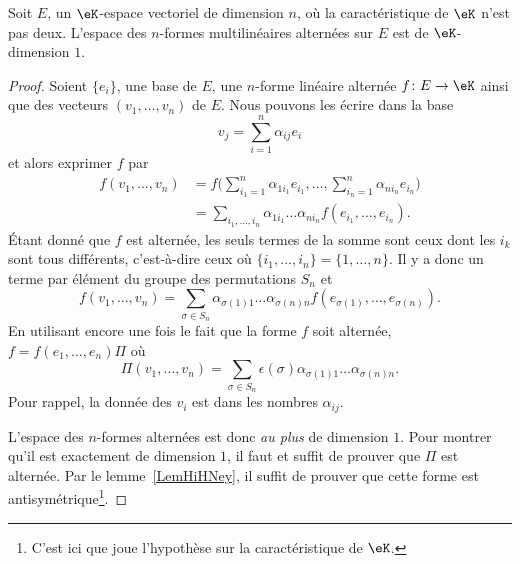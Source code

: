 \begin{proposition} \label{ProprbjihK}
	Soit \( E\), un \( \eK\)-espace vectoriel de dimension \( n\), où la caractéristique de \( \eK\) n'est pas deux. L'espace des \( n\)-formes multilinéaires alternées sur \( E\) est de \( \eK\)-dimension \( 1\).
\end{proposition}

\begin{proof}
	Soient \( \{ e_i \}\), une base de \( E\), une \( n\)-forme linéaire alternée \( f\colon E\to \eK\) ainsi que des vecteurs \( (v_1,\ldots, v_n)\) de \( E\). Nous pouvons les écrire dans la base
	\begin{equation}
		v_j=\sum_{i=1}^n\alpha_{ij}e_i
	\end{equation}
	et alors exprimer \( f\) par
	\begin{subequations}
		\begin{align}
			f(v_1,\ldots, v_n) & =f\big( \sum_{i_1=1}^n\alpha_{1i_1}e_{i_1},\ldots, \sum_{i_n=1}^n\alpha_{ni_n}e_{i_n} \big) \\
			                   & =\sum_{i_1,\ldots, i_n}\alpha_{1i_1}\ldots \alpha_{ni_n}f(e_{i_1},\ldots, e_{i_n}).
		\end{align}
	\end{subequations}
	Étant donné que \( f\) est alternée, les seuls termes de la somme sont ceux dont les \( i_k\) sont tous différents, c'est-à-dire ceux où \( \{ i_1,\ldots, i_n \}=\{ 1,\ldots, n \}\). Il y a donc un terme par élément du groupe des permutations \( S_n\) et
	\begin{equation}
		f(v_1,\ldots, v_n)=\sum_{\sigma\in S_n}\alpha_{\sigma(1)1}\ldots \alpha_{\sigma(n)n}f(e_{\sigma(1)},\ldots, e_{\sigma(n)}).
	\end{equation}
	En utilisant encore une fois le fait que la forme \( f\) soit alternée, \( f=f(e_1,\ldots, e_n)\Pi\) où
	\begin{equation}
		\Pi(v_1,\ldots, v_n)=\sum_{\sigma\in S_n}\epsilon(\sigma)\alpha_{\sigma(1)1}\ldots \alpha_{\sigma(n)n}.
	\end{equation}
	Pour rappel, la donnée des \( v_i\) est dans les nombres \( \alpha_{ij}\).

	L'espace des \( n\)-formes alternées est donc \emph{au plus} de dimension \( 1\). Pour montrer qu'il est exactement de dimension \( 1\), il faut et suffit de prouver que \( \Pi\) est alternée. Par le lemme~\ref{LemHiHNey}, il suffit de prouver que cette forme est antisymétrique\footnote{C'est ici que joue l'hypothèse sur la caractéristique de \( \eK\).}.


\end{proof}
